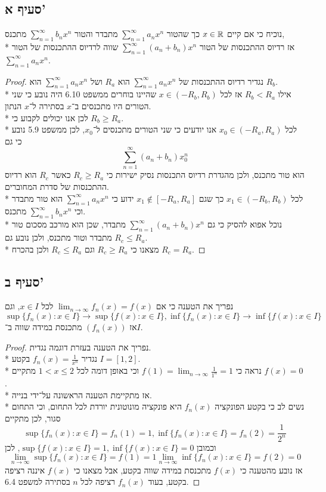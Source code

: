 \subsection{סעיף א'}
נוכיח כי אם קיים $x \in \mathbb{R}$ כך שהטור $\sum_{n = 1}^{\infty} a_n x^n$ מתבדר והטור $\sum_{n = 1}^{\infty} b_n x^n$ מתכנס, \\*
אז רדיוס ההתכנסות של הטור $\sum_{n = 1}^{\infty} (a_n + b_n) x^n$ שווה לרדיוס ההתכנסות של הטור $\sum_{n = 1}^{\infty} a_n x^n$.
\begin{proof}
	נגדיר רדיוס ההתכנסות של $\sum_{n = 1}^{\infty} a_n x^n$ הוא $R_a$ ושל $\sum_{n = 1}^{\infty} a_n x^n$ הוא $R_b$. \\*
	אילו $R_b < R_a$ אז לכל $x \in (-R_b, R_b)$ שהיינו בוחרים ממשפט 6.10 היה נובע כי שני הטורים היו מתכנסים ב־$x$ בסתירה ל־$x$ הנתון. \\*
	לכן אנו יכולים לקבוע כי $R_b \ge R_a$. \\*
	לכל $x_0 \in (-R_a, R_a)$ אנו יודעים כי שני הטורים מתכנסים ל־$x_0$, לכן ממשפט 5.9 נובע כי גם
	\[
		\sum_{n = 1}^{\infty} (a_n + b_n) x_0^n
	\]
	הוא טור מתכנס, ולכן מהגדרת רדיוס התכנסות נסיק ישירות כי $R_c \ge R_a$ כאשר $R_c$ הוא רדיוס ההתכנסות של סדרת המחוברים. \\*
	לכל $x_1 \in (-R_b, R_b)$ כך שגם $x_1 \notin [-R_a, R_a]$ ידוע כי $\sum_{n = 1}^{\infty} a_n x^n$ הוא טור מתבדר וכי $\sum_{n = 1}^{\infty} b_n x^n$ מתכנס. \\*
	נוכל אפוא להסיק כי גם $\sum_{n = 1}^{\infty} (a_n + b_n) x^n$ מתבדר, שכן הוא מורכב מסכום טור מתבדר וטור מתכנס, ולכן נובע גם $R_c \le R_a$. \\*
	מצאנו כי $R_c \ge R_a$ וגם $R_c \le R_a$ ולכן בהכרח $R_c = R_a$.
\end{proof}

\subsection{סעיף ב'}
נפריך את הטענה כי אם $\lim_{n \to \infty} f_n(x) = f(x)$ לכל $x \in I$, וגם
\[
	\sup\{f_n(x) : x \in I\} \rightarrow \sup\{ f(x) : x \in I\},
	\inf\{f_n(x) : x \in I\} \rightarrow \inf\{ f(x) : x \in I\}
\]
אז $(f_n(x))$ מתכנסת במידה שווה ב־$I$.
\begin{proof}
	נפריך את הטענה בעזרת דוגמה נגדית. \\*
	נגדיר $f_n(x) = \frac{1}{x^n}$ בקטע $I = [1, 2]$. \\*
	נראה כי $f(1) = \lim_{n \to \infty} \frac{1}{1^n} = 1$ וכי באופן דומה לכל $1 < x \le 2$ מתקיים $f(x) = 0$. \\*
	אז מתקיימת הטענה הראשונה על־ידי בנייה. \\*
	נשים לב כי בקטע הפונקציה $f_n(x)$ היא פונקציה מונוטונית יורדת לכל התחום, וכי התחום סגור, לכן מתקיים
	\[
		\sup\{ f_n(x) : x \in I \} = f_n(1) = 1,
		\inf\{ f_n(x) : x \in I \} = f_n(2) = \frac{1}{2^n}
	\]
	וכמובן $\sup\{ f(x) : x \in I\} = 1, \inf\{ f(x) : x \in I\} = 0$, לכן
	\[
		\lim_{n \to \infty} \sup\{ f_n(x) : x \in I \} = f(1) = 1
		\lim_{n \to \infty} \inf\{ f_n(x) : x \in I \} = f(2) = 0
	\]
	אז נובע מהטענה כי $f(x)$ מתכנסת במידה שווה בקטע, אבל מצאנו כי $f(x)$ איננה רציפה בקטע, בעוד $f_n(x)$ רציפה לכל $n$ בסתירה למשפט 6.4.
\end{proof}

